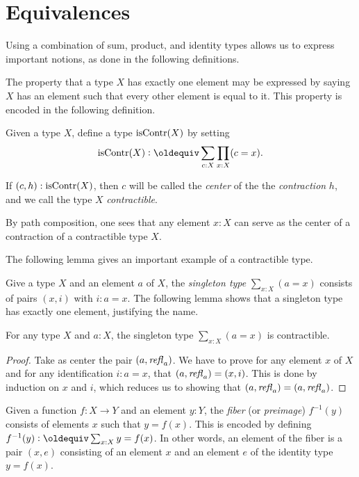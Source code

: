 \section{Equivalences}\label{sec:equivalence}

Using a combination of sum, product, and identity types allows
us to express important notions, as done in the following
definitions.

The property that a type $X$ has exactly one element may be expressed by saying $X$ has an element such that every other element is equal to it.
This property is encoded in the following definition.

\begin{definition}
  \label{def:contractible}
  Given a type $X$, define a type $\mathrm{isContr}(X)$ by setting
  $$\iscontr(X) \defeq \sum_{c:X} \prod_{x:X} (c=x).$$
\end{definition}

If $ (c,h) : \mathrm{isContr}(X) $, then $c$ will be called the {\em center} of the
the {\em contraction} $h$, and we call the type $X$ \emph{contractible}.

By path composition, one sees that any element $x : X$ can serve as the center of a contraction of a contractible type $X$.

The following lemma gives an important example of a contractible type.

Give a type $X$ and an element $a$ of $X$, 
the \emph{singleton type} $\sum_{x:X} (a=x)$
consists of pairs $(x,i)$ with $i: a=x$. The following lemma shows that a singleton type has exactly one element, justifying the name.

\begin{lemma}\label{lem:thepathspaceiscontractible}
For any type $X$ and $a:X$, the singleton type $\sum_{x:X} (a=x)$ is contractible.
\end{lemma}

\begin{proof}
Take as center the pair $(a,\mathop{{\it refl}_{a}})$. We have
to prove for any element $x$ of $X$ and for any identification
$i: a=x$, that $(a,\mathop{{\it refl}_{a}}) = (x,i)$.  This is done by induction on $x$ and $i$, which reduces us to showing
that $(a,\mathop{{\it refl}_{a}}) = (a,\mathop{{\it refl}_{a}})$.
\end{proof}

\begin{definition}
\label{def:fiber}
Given a function $f : X \to Y$ and an element $y:Y$, 
the \emph{fiber} (or \emph{preimage}) $f^{-1}(y)$ consists 
of elements $x$ such that $y = f(x)$.  
This is encoded by defining $f^{-1}(y) \defeq \sum_{x:X} y = f(x)$.  
In other words, an element of the fiber is a pair $(x,e)$ consisting
of an element $x$ and an element $e$ of the identity type $y = f(x)$.
\end{definition}

